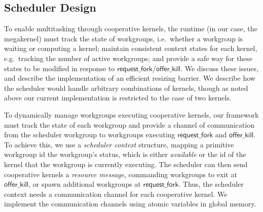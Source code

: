 \documentclass[sigconf]{acmart}
\newcommand{\kernelmerge}{\textsc{KernelMerge}}
\newcommand{\offerfork}{\mathsf{request\_fork}}
\newcommand{\offerkill}{\mathsf{offer\_kill}}
\newcommand{\getgroupid}{\mathsf{get\_group\_id}}
\newcommand{\getnumgroups}{\mathsf{get\_num\_groups}}
\begin{document}
{%
%

\subsection{Scheduler Design}\label{sec:resizingbarrier}\label{sec:schedulerimpl}

To enable multitasking through cooperative kernels, the runtime (in
our case, the megakernel) must track the state of workgroups,
i.e.\ whether a workgroup is waiting or computing a kernel; maintain
consistent context states for each kernel, e.g.\ tracking the number
of active workgroups; and provide a safe way for these states to be
modified in response to $\offerfork$/$\offerkill$. We discuss these
issues, and describe the implementation of an efficient resizing
barrier. We describe how the scheduler would handle arbitrary
combinations of kernels, though as noted above our current
implementation is restricted to the case of two kernels.

%
%
To dynamically manage workgroups executing cooperative kernels, our
framework must track the state of each workgroup and provide a channel
of communication from the scheduler workgroup to workgroups executing
$\offerfork$ and $\offerkill$. To achieve this, we use a
\emph{scheduler context} structure, mapping a primitive workgroup id
the workgroup's status, which is either \emph{available} or the id of
the kernel that the workgroup is currently executing.  The scheduler
can then send cooperative kernels a \emph{resource message},
commanding workgroups to exit at $\offerkill$, or spawn additional
workgroups at $\offerfork$. Thus, the scheduler context needs a
communication channel for each cooperative kernel. We implement the
communication channels using atomic variables in global memory.

}
\end{document}
